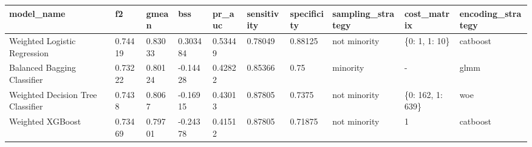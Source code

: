 \begin{tabular}{|l|l|l|l|l|l|l|l|l|l|}
\hline
\textbf{model\_name}              & \textbf{f2} & \textbf{gmean} & \textbf{bss} & \textbf{pr\_auc} & \textbf{sensitivity} & \textbf{specificity} & \textbf{sampling\_strategy} & \textbf{cost\_matrix} & \textbf{encoding\_strategy} \\ \hline
Weighted Logistic Regression      & 0.74419     & 0.83033        & 0.303484     & 0.53449          & 0.78049              & 0.88125              & not minority                & \{0: 1, 1: 10\}       & catboost                    \\ \hline
Balanced Bagging Classifier       & 0.73222     & 0.80124        & -0.14428     & 0.42822          & 0.85366              & 0.75                 & minority                    & -                     & glmm                        \\ \hline
Weighted Decision Tree Classifier & 0.7438      & 0.8067         & -0.16915     & 0.43013          & 0.87805              & 0.7375               & not minority                & \{0: 162, 1: 639\}    & woe                         \\ \hline
Weighted XGBoost                  & 0.73469     & 0.79701        & -0.24378     & 0.41512          & 0.87805              & 0.71875              & not minority                & 1                     & catboost                    \\ \hline
\end{tabular}